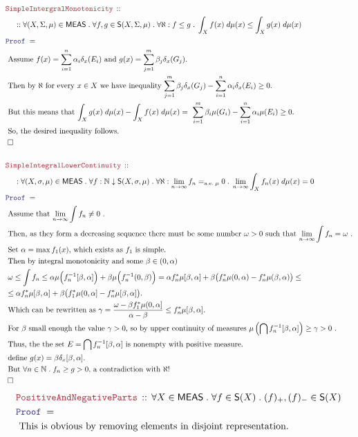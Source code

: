 \documentclass[12pt]{scrartcl}
\newcommand{\LOGIC}[1]{\textcolor{Blue}{\mathtt{#1}}}
\newcommand{\THM}[1]{\textcolor{Maroon}{\mathtt{#1}}}
\renewcommand{\.}{\; . \;}
\newcommand{\Theorem}[2]{& \THM{#1} \, :: \, #2 \\ & \Proof = \\ }
\newcommand{\NewLine}{\\ & \kern 1pc}
\newcommand{\Page}[1]{ \begin{align*} #1 \end{align*}   }
\newcommand{\Nat}{\mathbb{N} }
\newcommand{\QED}{\; \square}
\newcommand{\EndProof}{& \QED \\}
\newcommand{\Proof}{\LOGIC{Proof} \; }
\newcommand{\Explain}[1]{& \text{#1.} \\}
\newcommand{\ExplainFurther}[1]{& \text{#1} \\}
\newcommand{\Exclaim}[1]{& \text{#1!} \\}
\renewcommand{\ae}{\mathrm{a.e.}}
\newcommand{\MEAS}{\mathsf{MEAS}}
\newcommand{\Simple}{\mathsf{S}}
\begin{document}
\Page{
	\Theorem{SimpleIntergralMonotonicity}
	{
		\NewLine ::		
		\forall (X,\Sigma,\mu) \in \MEAS \.
		\forall f,g \in \Simple(X,\Sigma,\mu) \.
		\forall \aleph  : f \le g \.
		\int_X f(x) \; d\mu(x) \le \int_X g(x) \; d\mu(x)
	}
	\Explain{
		Assume $f(x) = \sum^n_{i=1} \alpha_i \delta_x(E_i)$ and 
		$g(x) = \sum^m_{j=1} \beta_j \delta_x(G_j)$}
	\Explain{
		Then by $\aleph$ for every $x \in X$ we have inequality
		$
			\sum^m_{j=1} \beta_j \delta_x(G_j) - 
			\sum^n_{i=1} \alpha_i \delta_x(E_i) \ge 0
		$}
	\Explain{ 
		But this means that 
		$
			\int_X g(x) \; d\mu(x) - \int_X f(x) \; d\mu(x)  =
			\  \sum^m_{i=1} \beta_i \mu(G_i) - \sum^n_{i=1} \alpha_i \mu(E_i) \ge 0 
		$}
	\Explain{
		So, the desired inequality follows}
	\EndProof
	\\
	\Theorem{SimpleIntegralLowerContinuity}
	{
		\NewLine :
		\forall (X,\sigma,\mu)  \in \MEAS\.
		\forall f : \Nat \downarrow \Simple(X,\sigma,\mu) \.
		\forall \aleph  :   \lim_{n \to \infty} f_n =_{\ae \; \mu} 0 \.
		\lim_{n \to \infty} \int_X f_n(x) \; d\mu(x) = 0
	}
	\Explain{ 
		Assume that  $\lim_{n\to \infty} \int f_n \neq 0$ }
	\Explain{
		Then, as they form a decreasing sequence there must be some number 
		$\omega > 0$ such that $\lim_{n\to \infty} \int f_n = \omega$	
	}
	\Explain{ 
		Set $\alpha = \max f_1(x)$, which exists as $f_1$ is simple}
	\ExplainFurther{ 
		Then by  integral monotonicity and some $\beta \in (0,\alpha)$ }
	\ExplainFurther{
		$	
			\omega \le \int f_n \le 
			\alpha \mu\Big( f_n^{-1}[\beta,\alpha]\Big) + \beta \mu\Big( f_n^{-1}(0,\beta) \Big)  =
			\alpha f_n^*\mu[\beta,\alpha] + 
			\beta \big( f_n^*\mu(0,\alpha ) - f_n^*\mu(\beta,\alpha) \big) \le$}  
 	\Explain{		
 		$
 			\le \alpha f_n^*\mu[\beta,\alpha] + 
			\beta \big( f_1^*\mu(0,\alpha ] - f_n^*\mu[\beta,\alpha] \big)
		$}
	\Explain{
		Which can be rewritten as 
		$
			\gamma =  \frac{\omega -   \beta f_1^*\mu(0,\alpha ]}{\alpha - \beta} \le  f_n^*\mu[\beta,\alpha]
		$}
	\Explain{
		For $\beta$ small enough the value $\gamma>0$,
		so by upper continuity of measures
		$\mu\left( \bigcap f^{-1}_n[\beta,\alpha] \right) \ge \gamma > 0$		}
	\Explain{
		Thus, the the set $E = \bigcap f^{-1}_n[\beta,\alpha] $ is nonempty with positive measure}
	\Explain{
		define $g(x) = \beta \delta_x[\beta,\alpha]$}
	\Exclaim{ 
		But $\forall n \in \Nat \.  f_n \ge g > 0$, a contradiction with $\aleph$}
	\EndProof
}\Page{
	\Theorem{PositiveAndNegativeParts}
	{
		\forall X \in \MEAS \.
		\forall f \in \Simple(X) \.
		(f)_+,(f)_- \in \Simple(X)
	}
	\Explain{ This is obvious by removing elements in disjoint representation}
}
\end{document}
